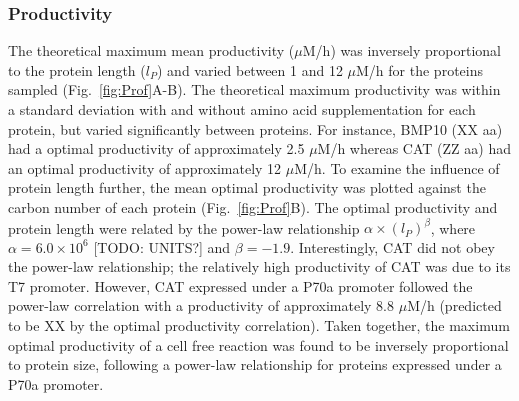 \documentclass[journal=asbcd6,manuscript=article]{achemso}
\begin{document}
\subsubsection{Productivity}
The theoretical maximum mean productivity ($\mu$M/h) was inversely proportional to the protein length ($l_{P}$) and varied between 1 and 12 $\mu$M/h for the proteins sampled (Fig.~\ref{fig:Prof}A-B). The theoretical maximum productivity was within a standard deviation with and without
amino acid supplementation for each protein, but varied significantly between proteins.
For instance, BMP10 (XX aa) had a optimal productivity of approximately 2.5 $\mu$M/h whereas CAT (ZZ aa) had an optimal productivity of approximately 12 $\mu$M/h.
To examine the influence of protein length further, the mean optimal productivity was plotted against the carbon number of each protein (Fig.~\ref{fig:Prof}B).
The optimal productivity and protein length were related by the power-law relationship $\alpha\times(l_{P})^{\beta}$, where $\alpha = 6.0\times 10^{6}$ [TODO: UNITS?] and $\beta=-1.9$.
Interestingly, CAT did not obey the power-law relationship; the relatively high productivity of CAT was due to its T7 promoter.
However, CAT expressed under a P70a promoter followed the power-law correlation with a productivity of approximately 8.8 $\mu$M/h (predicted to be XX by the optimal productivity correlation). Taken together, the maximum optimal productivity of a cell free reaction was found to be inversely proportional to protein size,
following a power-law relationship for proteins expressed under a P70a promoter.

\end{document}
